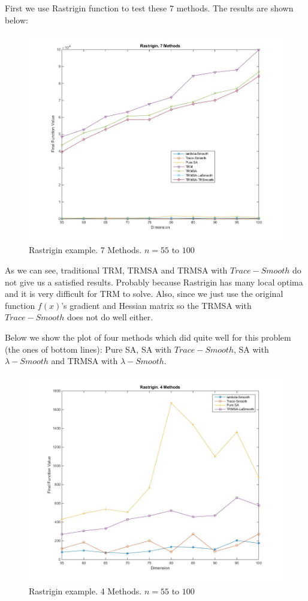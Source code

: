 \documentclass[letterpaper,12pt,titlepage,oneside,final]{book}
\begin{document}
First we use Rastrigin function to test these 7 methods. The results are shown below:

\begin{figure}[H]
\includegraphics[scale=0.5]{rast7methods.jpg}
\caption{Rastrigin example. 7 Methods. $n=55$ to $100$}
\end{figure}

As we can see, traditional TRM, TRMSA and TRMSA with $Trace-Smooth$ do not give us a satisfied results. Probably because Rastrigin has many local optima and it is very difficult for TRM to solve. Also, since we just use the original function $f(x)$'s gradient and Hessian matrix so the TRMSA with $Trace-Smooth$ does not do well either. 

Below we show the plot of four methods which did quite well for this problem (the ones of bottom lines): Pure SA, SA with $Trace-Smooth$, SA with $\lambda-Smooth$ and TRMSA with $\lambda-Smooth$.

\begin{figure}[H]
\includegraphics[scale=0.5]{rast4methods.jpg}
\caption{Rastrigin example. 4 Methods. $n=55$ to $100$}
\end{figure}
\end{document}
